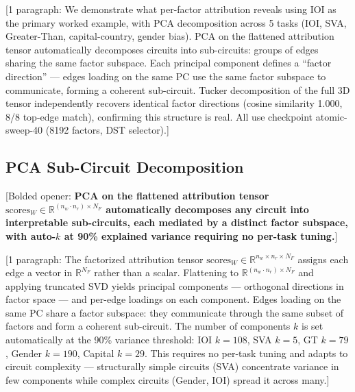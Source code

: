 \documentclass[11pt]{article}
\begin{document}

[1 paragraph: We demonstrate what per-factor attribution reveals using
IOI as the primary worked example, with PCA decomposition across 5 tasks
(IOI, SVA, Greater-Than, capital-country, gender bias). PCA on the
flattened attribution tensor automatically decomposes circuits into
sub-circuits: groups of edges sharing the same factor subspace. Each
principal component defines a ``factor direction'' --- edges loading on
the same PC use the same factor subspace to communicate, forming a
coherent sub-circuit. Tucker decomposition of the full 3D tensor
independently recovers identical factor directions (cosine similarity
1.000, 8/8 top-edge match), confirming this structure is real. All use
checkpoint atomic-sweep-40 (8192 factors, DST selector).]

\subsection{PCA Sub-Circuit Decomposition}

[Bolded opener: \textbf{PCA on the flattened attribution tensor
$\text{scores}_W \in \mathbb{R}^{(n_w \cdot n_r) \times N_F}$
automatically decomposes any circuit into interpretable sub-circuits,
each mediated by a distinct factor subspace, with auto-$k$ at 90\%
explained variance requiring no per-task tuning.}]


[1 paragraph: The factorized attribution tensor
$\text{scores}_W \in \mathbb{R}^{n_w \times n_r \times N_F}$ assigns
each edge a vector in $\mathbb{R}^{N_F}$ rather than a scalar. Flattening
to $\mathbb{R}^{(n_w \cdot n_r) \times N_F}$ and applying truncated SVD
yields principal components --- orthogonal directions in factor space ---
and per-edge loadings on each component. Edges loading on the same PC
share a factor subspace: they communicate through the same subset of
factors and form a coherent sub-circuit. The number of components $k$ is
set automatically at the 90\% variance threshold: IOI $k{=}108$,
SVA $k{=}5$, GT $k{=}79$, Gender $k{=}190$, Capital $k{=}29$. This
requires no per-task tuning and adapts to circuit complexity ---
structurally simple circuits (SVA) concentrate variance in few
components while complex circuits (Gender, IOI) spread it across many.]
\end{document}
